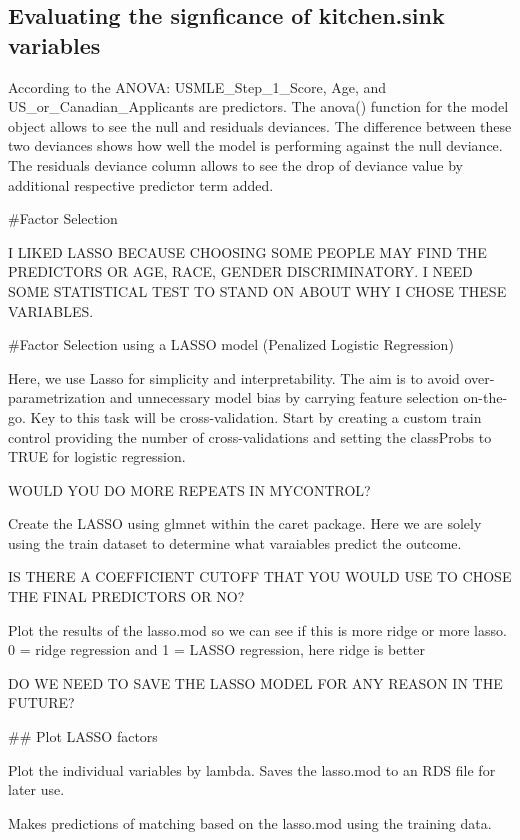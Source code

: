 \documentclass[12pt,]{article}
\begin{document}
\hypertarget{evaluating-the-signficance-of-kitchen.sink-variables}{%
\subsection{Evaluating the signficance of kitchen.sink
variables}\label{evaluating-the-signficance-of-kitchen.sink-variables}}

According to the ANOVA: USMLE\_Step\_1\_Score, Age, and
US\_or\_Canadian\_Applicants are predictors. The anova() function for
the model object allows to see the null and residuals deviances. The
difference between these two deviances shows how well the model is
performing against the null deviance. The residuals deviance column
allows to see the drop of deviance value by additional respective
predictor term added.

\#Factor Selection

I LIKED LASSO BECAUSE CHOOSING SOME PEOPLE MAY FIND THE PREDICTORS OR
AGE, RACE, GENDER DISCRIMINATORY. I NEED SOME STATISTICAL TEST TO STAND
ON ABOUT WHY I CHOSE THESE VARIABLES.

\#Factor Selection using a LASSO model (Penalized Logistic Regression)

Here, we use Lasso for simplicity and interpretability. The aim is to
avoid over-parametrization and unnecessary model bias by carrying
feature selection on-the-go. Key to this task will be cross-validation.
Start by creating a custom train control providing the number of
cross-validations and setting the classProbs to TRUE for logistic
regression.

WOULD YOU DO MORE REPEATS IN MYCONTROL?

Create the LASSO using glmnet within the caret package. Here we are
solely using the train dataset to determine what varaiables predict the
outcome.

IS THERE A COEFFICIENT CUTOFF THAT YOU WOULD USE TO CHOSE THE FINAL
PREDICTORS OR NO?

Plot the results of the lasso.mod so we can see if this is more ridge or
more lasso. 0 = ridge regression and 1 = LASSO regression, here ridge is
better

DO WE NEED TO SAVE THE LASSO MODEL FOR ANY REASON IN THE FUTURE?

\#\# Plot LASSO factors

Plot the individual variables by lambda. Saves the lasso.mod to an RDS
file for later use.

Makes predictions of matching based on the lasso.mod using the training
data.
\end{document}
